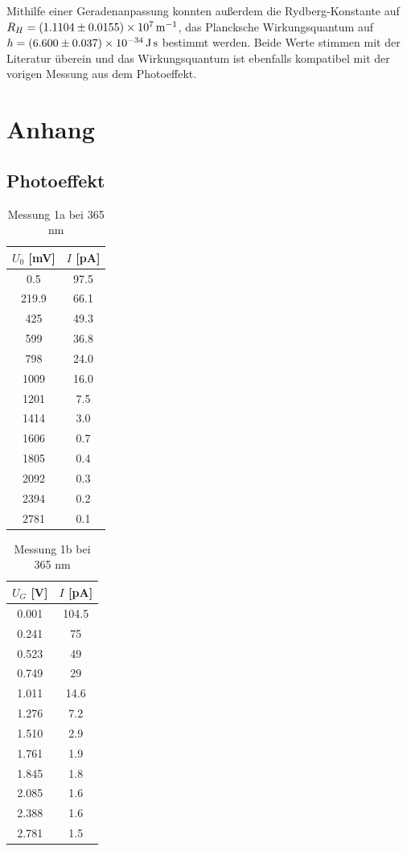 \documentclass{article}
\begin{document}
Mithilfe einer Geradenanpassung konnten außerdem die Rydberg-Konstante auf $R_H = \SI{1.1104\pm0.0155e7}{\per\m}$,
das Plancksche Wirkungsquantum auf $h = \SI{6.600\pm0.037e-34}{\J\s}$ bestimmt werden. Beide Werte stimmen mit der Literatur
überein und das Wirkungsquantum ist ebenfalls kompatibel mit der vorigen Messung aus dem Photoeffekt.


\clearpage
\section{Anhang}
\subsection{Photoeffekt}

\begin{table}[h!]
  \centering
  \begin{tabular}{|c|c|}
      \hline
      $U_0$ [mV] & $I$ [pA] \\
      \hline
      0.5   & 97.5 \\
      219.9 & 66.1 \\
      425   & 49.3 \\
      599   & 36.8 \\
      798   & 24.0 \\
      1009  & 16.0 \\
      1201  & 7.5  \\
      1414  & 3.0  \\
      1606  & 0.7  \\
      1805  & 0.4  \\
      2092  & 0.3  \\
      2394  & 0.2  \\
      2781  & 0.1  \\
      \hline
  \end{tabular}
  \caption{Messung 1a bei 365 nm}
  \label{tab:messung1a}
\end{table}

\begin{table}[h!]
  \centering
  \begin{tabular}{|c|c|}
      \hline
      $U_G$ [V] & $I$ [pA] \\
      \hline
      0.001  & 104.5 \\
      0.241  & 75    \\
      0.523  & 49    \\
      0.749  & 29    \\
      1.011  & 14.6  \\
      1.276  & 7.2   \\
      1.510  & 2.9   \\
      1.761  & 1.9   \\
      1.845  & 1.8   \\
      2.085  & 1.6   \\
      2.388  & 1.6   \\
      2.781  & 1.5   \\
      \hline
  \end{tabular}
  \caption{Messung 1b bei 365 nm}
  \label{tab:messung1b}
\end{table}
\end{document}
